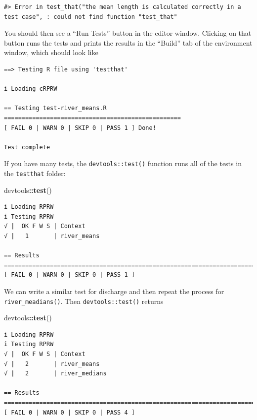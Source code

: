 \documentclass[
]{book}
\newenvironment{Shaded}{\begin{snugshade}}{\end{snugshade}}
\newcommand{\KeywordTok}[1]{\textcolor[rgb]{0.13,0.29,0.53}{\textbf{#1}}}
\newcommand{\NormalTok}[1]{#1}
\newcommand{\OperatorTok}[1]{\textcolor[rgb]{0.81,0.36,0.00}{\textbf{#1}}}
\begin{document}
\begin{verbatim}
#> Error in test_that("the mean length is calculated correctly in a test case", : could not find function "test_that"
\end{verbatim}

You should then see a ``Run Tests'' button in the editor window. Clicking on that button runs the tests and prints the results in the ``Build'' tab of the environment window, which should look like

\begin{verbatim}
==> Testing R file using 'testthat'

i Loading cRPRW

== Testing test-river_means.R ==================================================
[ FAIL 0 | WARN 0 | SKIP 0 | PASS 1 ] Done!

Test complete
\end{verbatim}

If you have many tests, the \texttt{devtools::test()} function runs all of the tests in the \texttt{testthat} folder:

\begin{Shaded}
\begin{Highlighting}[]
\NormalTok{devtools}\OperatorTok{::}\KeywordTok{test}\NormalTok{()}
\end{Highlighting}
\end{Shaded}

\begin{verbatim}
i Loading RPRW
i Testing RPRW
√ |  OK F W S | Context
√ |   1       | river_means                                                     
                                               
== Results =========================================================================
[ FAIL 0 | WARN 0 | SKIP 0 | PASS 1 ]
\end{verbatim}

We can write a similar test for discharge and then repeat the process for \texttt{river\_meadians()}. Then \texttt{devtools::test()} returns

\begin{Shaded}
\begin{Highlighting}[]
\NormalTok{devtools}\OperatorTok{::}\KeywordTok{test}\NormalTok{()}
\end{Highlighting}
\end{Shaded}

\begin{verbatim}
i Loading RPRW
i Testing RPRW
√ |  OK F W S | Context
√ |   2       | river_means                                                         
√ |   2       | river_medians                                                       

== Results =========================================================================
[ FAIL 0 | WARN 0 | SKIP 0 | PASS 4 ]
\end{verbatim}
\end{document}
